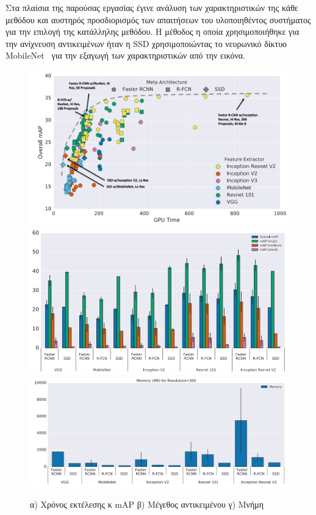 Στα πλαίσια της παρούσας εργασίας έγινε ανάλυση των χαρακτηριστικών της κάθε μεθόδου
και αυστηρός προσδιορισμός των απαιτήσεων του υλοποιηθέντος συστήματος για την
επιλογή της κατάλληλης μεθόδου. Η μέθοδος η οποία χρησιμοποιήθηκε για την
ανίχνευση αντικειμένων ήταν η SSD χρησιμοποιώντας το νευρωνικό δίκτυο MobileNet~\cite{DBLP:journals/corr/HowardZCKWWAA17}
για την εξαγωγή των χαρακτηριστικών από την εικόνα.

\begin{figure}[htp]
    \centering
    \includegraphics[width=.50\maxwidth]{../figures/speedvsaccuracy.png}\hfill
    \includegraphics[width=.50\maxwidth]{../figures/imagesize.png}\hfill
    \includegraphics[width=.52\maxwidth]{../figures/memory.png}\hfill

    \caption{α) Χρόνος εκτέλεσης κ mAP β) Μέγεθος αντικειμένου γ) Μνήμη}
    \label{fig:bee}

\end{figure}

